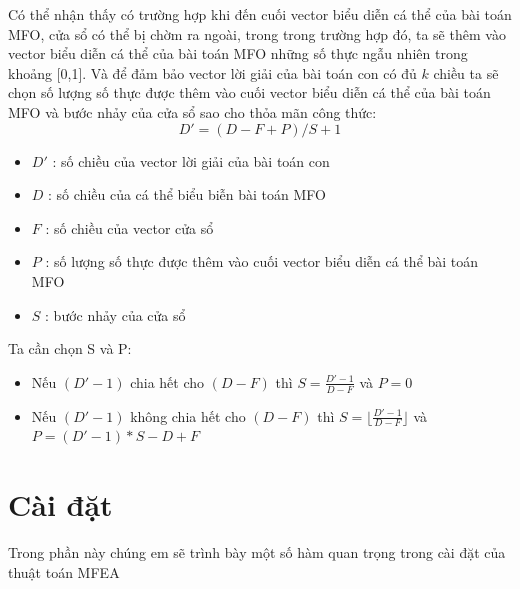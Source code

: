 \documentclass[a4paper,12pt]{report}
\begin{document}
\par Có thể nhận thấy có trường hợp khi đến cuối vector biểu diễn cá thể của bài toán MFO, cửa sổ có thể bị chờm ra ngoài, trong trong trường hợp đó, ta sẽ thêm vào vector biểu diễn cá thể của bài toán MFO những số thực ngẫu nhiên trong khoảng [0,1]. Và để đảm bảo vector lời giải của bài toán con có đủ $k$ chiều ta sẽ chọn số lượng số thực được thêm vào cuối vector biểu diễn cá thể của bài toán MFO và bước nhảy của cửa sổ sao cho thỏa mãn công thức:  
$$D' = (D-F+P)/S + 1$$
\begin{itemize}
\item $D'$ : số chiều của vector lời giải của bài toán con
\item $D$ : số chiều của cá thể biểu biễn bài toán MFO 
\item $F$ : số chiều của vector cửa sổ 
\item $P$ : số lượng số thực được thêm vào cuối vector biểu diễn cá thể bài toán MFO
\item $S$ : bước nhảy của cửa sổ   
\end{itemize}
\par Ta cần chọn S và P:
\begin{itemize}
\item Nếu $(D'-1)$ chia hết cho $(D-F)$ thì $S = \frac{D'-1}{D-F}$ và $P=0$
\item Nếu $(D'-1)$ không chia hết cho $(D-F)$ thì $S =  \lfloor \frac{D'-1}{D-F} \rfloor$  và $P = (D'-1)*S - D + F$ 
\end{itemize}

\section{Cài đặt} 
Trong phần này chúng em sẽ trình bày một số hàm quan trọng trong cài đặt của thuật toán MFEA 
\end{document}
